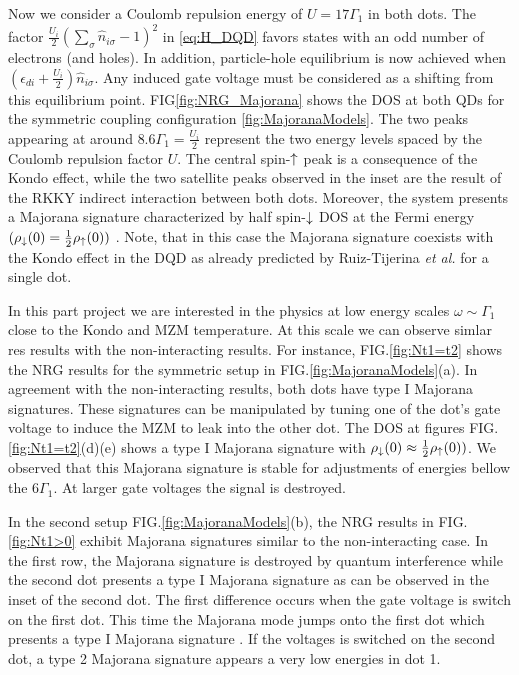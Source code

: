 \documentclass[showpacs,aps,prb,reprint,superscriptaddress]{revtex4-1}
\begin{document}
    

    Now we consider a Coulomb repulsion energy of $U = 17\Gamma_1$ in both dots. The factor $ \frac{U_i}{2}(\sum_{\sigma} \hat{n}_{i\sigma}-1)^{2}$ in \eqref{eq:H_DQD} favors states with an odd number of electrons (and holes). In addition, particle-hole equilibrium is now achieved when $\left(\epsilon_{di}+\frac{U_i}{2}\right)\hat{n}_{i\sigma}$.  Any induced gate voltage must be considered as a shifting from this equilibrium point. FIG\ref{fig:NRG_Majorana} shows the DOS at both QDs for the symmetric coupling configuration \ref{fig:MajoranaModels}. The two peaks appearing at around $8.6\Gamma_1 = \frac{U_i}{2}$ represent the two energy levels spaced by the Coulomb repulsion factor $U$. The central spin-$\uparrow$ peak is a consequence of the Kondo effect, \cite{hewson_kondo_1997,wilson_renormalization_1975}  while the two satellite peaks observed in the inset  are the result of the  RKKY indirect interaction between both dots.  \cite{ruderman_indirect_1954,kasuya_theory_1956,yosida_magnetic_1957} Moreover, the system presents a Majorana signature characterized by half spin-$\downarrow$ DOS at the Fermi energy $(\rho_\downarrow(0) = \frac{1}{2}\rho_\uparrow(0))$  . Note, that in this case the Majorana signature coexists with the Kondo effect in the DQD as already predicted by Ruiz-Tijerina \textit{et al.} for a single dot. \cite{ruiz-tijerina_interaction_2015}

    In this part project we are interested in the physics at low energy scales $\omega \sim \Gamma_1 $ close to the Kondo and MZM temperature. At this scale we can observe simlar res results with the non-interacting results. For instance, FIG.\ref{fig:Nt1=t2} shows the NRG results for the symmetric setup in FIG.\ref{fig:MajoranaModels}(a). In agreement with the non-interacting results, both dots have type I Majorana signatures. These signatures can be manipulated by tuning one of the dot's gate voltage to induce the MZM to leak into the other dot. The DOS at figures FIG.\ref{fig:Nt1=t2}(d)(e) shows a type I Majorana signature with $\rho_\downarrow(0) \approx \frac{1}{2}\rho_\uparrow(0))$. We observed that this Majorana signature is stable for adjustments of energies bellow the $6\Gamma_1$. At larger gate voltages the signal is  destroyed.


    In the second setup FIG.\ref{fig:MajoranaModels}(b), the NRG results in  FIG.\ref{fig:Nt1>0} exhibit Majorana signatures similar to the non-interacting case. In the first row, the Majorana signature is destroyed by quantum interference while the second dot presents a type I Majorana signature as can be observed in the inset of the second dot. The first difference occurs when the gate voltage is switch on the first dot. This time the Majorana mode jumps onto the first dot which presents a type I Majorana signature . If the voltages is switched on the second dot, a type 2 Majorana signature appears a very low energies in dot 1. 
    
\end{document}
